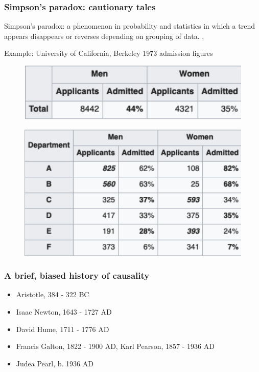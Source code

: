 \begin{frame}
    \frametitle{Simpson's paradox: cautionary tales}
    Simpson's paradox: a phenomenon in probability and statistics in which a trend appears disappears or reverses depending on grouping of data. \cite{simpson-wikipedia}, \cite{pearl2016causal} \newline

    Example: University of California, Berkeley 1973 admission figures\newline

    \begin{figure}[ht]
        \includegraphics[height=0.15\textheight]{graphics/berkeley}\newline
        \cite{freedman1998statistics}
    \end{figure}
    \begin{figure}[ht]
        \includegraphics[height=0.3\textheight]{graphics/berkeley_later}\newline
        \cite{Bickel398}
    \end{figure}

\end{frame}


\begin{frame}
\frametitle{A brief, biased history of causality}
\begin{itemize}
\item Aristotle, 384 - 322 BC
\item Isaac Newton, 1643 - 1727 AD
\item David Hume, 1711 - 1776 AD
\item Francis Galton, 1822 - 1900 AD, Karl Pearson, 1857 - 1936 AD
\item Judea Pearl, b. 1936 AD
\end{itemize}
\end{frame}


